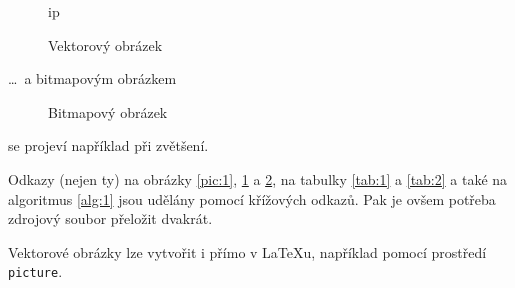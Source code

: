 \documentclass[a4paper, 11pt]{article}
\begin{document}
\begin{figure}[h]
ip
\caption{Vektorový obrázek} \label{pic:2}
\end{figure}
\setlength{\parskip}{1em}
\noindent\dots\ a bitmapovým obrázkem
\begin{figure}[h]
\centering
{} 
\medskip
\caption{Bitmapový obrázek} \label{pic:3}
\end{figure} 

\noindent se projeví například při zvětšení.\par\setlength{\parskip}{0em}
Odkazy (nejen ty) na obrázky \ref{pic:1}, \ref{pic:2} a \ref{pic:3}, na tabulky \ref{tab:1} a \ref{tab:2} a také na algoritmus \ref{alg:1} jsou udělány pomocí křížových odkazů. Pak je ovšem potřeba zdrojový soubor přeložit dvakrát.\par
Vektorové obrázky lze vytvořit i přímo v \LaTeX u, například pomocí prostředí\verb| picture|.

\newpage
\end{document}
